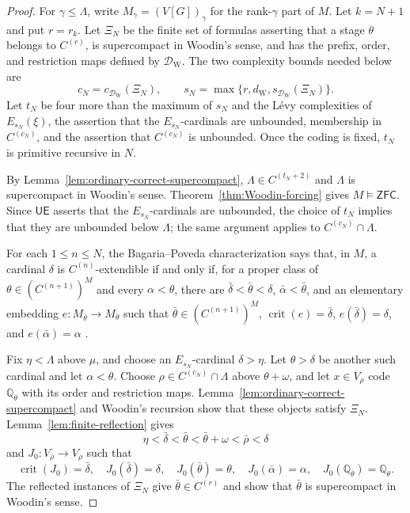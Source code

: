 \documentclass[11pt,a4paper]{amsart}
\newcommand{\ZFC}{\mathsf{ZFC}}
\newcommand{\crit}{\operatorname{crit}}
\newcommand{\UE}{\mathsf{UE}}
\theoremstyle{plain}
\theoremstyle{definition}
\theoremstyle{remark}
\begin{document}
\begin{proof}
For $\gamma\leq\Lambda$, write $M_\gamma=(V[G])_\gamma$ for the rank-$\gamma$ part of $M$.  Let $k=N+1$ and put $r=r_k$.  Let $\Xi_N$ be the finite set of formulas asserting that a stage $\theta$ belongs to $C^{(r)}$, is supercompact in Woodin's sense, and has the prefix, order, and restriction maps defined by $\mathcal D_{\mathrm W}$.  The two complexity bounds needed below are
\[
c_N=c_{\mathcal D_{\mathrm W}}(\Xi_N),\qquad
s_N=\max\{r,d_{\mathrm W},s_{\mathcal D_{\mathrm W}}(\Xi_N)\}.
\]
Let $t_N$ be four more than the maximum of $s_N$ and the L\'evy complexities of $E_{s_N}(\xi)$, the assertion that the $E_{s_N}$-cardinals are unbounded, membership in $C^{(c_N)}$, and the assertion that $C^{(c_N)}$ is unbounded.  Once the coding is fixed, $t_N$ is primitive recursive in $N$.

By Lemma~\ref{lem:ordinary-correct-supercompact}, $\Lambda\in C^{(t_N+2)}$ and $\Lambda$ is supercompact in Woodin's sense.  Theorem~\ref{thm:Woodin-forcing} gives $M\models\ZFC$.  Since $\UE$ asserts that the $E_{s_N}$-cardinals are unbounded, the choice of $t_N$ implies that they are unbounded below $\Lambda$; the same argument applies to $C^{(c_N)}\cap\Lambda$.

For each $1\leq n\leq N$, the Bagaria--Poveda characterization says that, in $M$, a cardinal $\delta$ is $C^{(n)}$-extendible if and only if, for a proper class of $\theta\in(C^{(n+1)})^M$ and every $\alpha<\theta$, there are $\bar\delta<\bar\theta<\delta$, $\bar\alpha<\bar\theta$, and an elementary embedding $e:M_{\bar\theta}\to M_\theta$ such that $\bar\theta\in(C^{(n+1)})^M$, $\crit(e)=\bar\delta$, $e(\bar\delta)=\delta$, and $e(\bar\alpha)=\alpha$ \cite[Corollary~2.7]{BagariaPoveda}.

Fix $\eta<\Lambda$ above $\mu$, and choose an $E_{s_N}$-cardinal $\delta>\eta$.  Let $\theta>\delta$ be another such cardinal and let $\alpha<\theta$.  Choose $\rho\in C^{(c_N)}\cap\Lambda$ above $\theta+\omega$, and let $x\in V_\rho$ code $\mathbb Q_\theta$ with its order and restriction maps.  Lemma~\ref{lem:ordinary-correct-supercompact} and Woodin's recursion show that these objects satisfy $\Xi_N$.  Lemma~\ref{lem:finite-reflection} gives
\[
\eta<\bar\delta<\bar\theta<\bar\theta+\omega<\bar\rho<\delta
\]
and $J_0:V_{\bar\rho}\to V_\rho$ such that
\[
\crit(J_0)=\bar\delta,\quad J_0(\bar\delta)=\delta,\quad
J_0(\bar\theta)=\theta,\quad J_0(\bar\alpha)=\alpha,
\quad J_0(\mathbb Q_{\bar\theta})=\mathbb Q_\theta.
\]
The reflected instances of $\Xi_N$ give $\bar\theta\in C^{(r)}$ and show that $\bar\theta$ is supercompact in Woodin's sense.


\end{proof}
\end{document}
